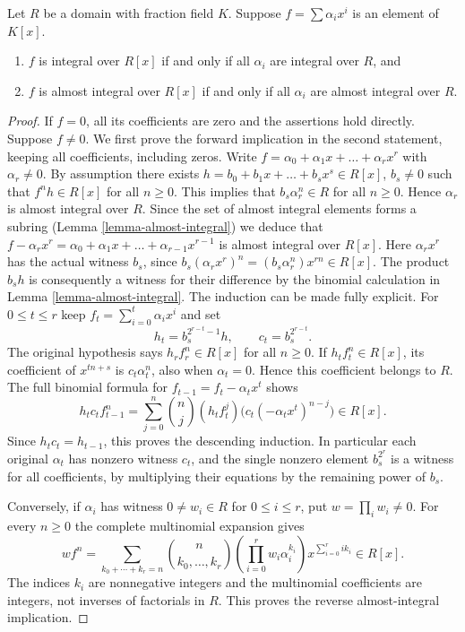 \begin{lemma}
\label{lemma-prepare-polynomial-ring-normal}
Let $R$ be a domain with fraction field $K$.
Suppose $f = \sum \alpha_i x^i$ is an
element of $K[x]$.
\begin{enumerate}
\item $f$ is integral over $R[x]$ if and only if
all $\alpha_i$ are integral over $R$, and
\item $f$ is almost integral over $R[x]$ if and only if
all $\alpha_i$ are almost integral over $R$.
\end{enumerate}
\end{lemma}

\begin{proof}
If $f=0$, all its coefficients are zero and the assertions hold
directly. Suppose $f\ne0$. We first prove the forward implication
in the second statement, keeping all coefficients, including zeros.
Write $f = \alpha_0 + \alpha_1 x + \ldots + \alpha_r x^r$
with $\alpha_r \not = 0$.
By assumption there exists $h = b_0 + b_1 x + \ldots + b_s x^s \in R[x]$,
$b_s \not = 0$ such that $f^n h \in R[x]$ for all
$n \geq 0$. This implies that $b_s \alpha_r^n \in R$
for all $n \geq 0$. Hence $\alpha_r$ is almost
integral over $R$. Since the set of almost integral
elements forms a subring (Lemma \ref{lemma-almost-integral}) we deduce that
$f - \alpha_r x^r = \alpha_0 + \alpha_1 x + \ldots + \alpha_{r - 1} x^{r - 1}$
is almost integral over $R[x]$. Here $\alpha_rx^r$ has the
actual witness $b_s$, since
$b_s(\alpha_rx^r)^n=(b_s\alpha_r^n)x^{rn}\in R[x]$.
The product $b_sh$ is consequently a witness for their difference
by the binomial calculation in Lemma \ref{lemma-almost-integral}.
The induction can be made fully explicit. For $0\leq t\leq r$
keep $f_t=\sum_{i=0}^t\alpha_ix^i$ and set
$$
h_t=b_s^{2^{r-t}-1}h,\qquad c_t=b_s^{2^{r-t}}.
$$
The original hypothesis says $h_rf_r^n\in R[x]$ for all $n\geq0$.
If $h_tf_t^n\in R[x]$, its coefficient of $x^{tn+s}$ is
$c_t\alpha_t^n$, also when $\alpha_t=0$. Hence this coefficient
belongs to $R$. The full binomial formula for
$f_{t-1}=f_t-\alpha_tx^t$ shows
$$
h_tc_t f_{t-1}^n
=\sum_{j=0}^n\binom nj(h_tf_t^j)
 \bigl(c_t(-\alpha_tx^t)^{n-j}\bigr)\in R[x].
$$
Since $h_tc_t=h_{t-1}$, this proves the descending induction.
In particular each original $\alpha_t$ has nonzero witness $c_t$,
and the single nonzero element $b_s^{2^r}$ is a witness for
all coefficients, by multiplying their equations by the remaining
power of $b_s$.

Conversely, if $\alpha_i$ has witness $0\ne w_i\in R$ for
$0\leq i\leq r$, put $w=\prod_iw_i\ne0$. For every $n\geq0$
the complete multinomial expansion gives
$$
w f^n=\sum_{k_0+\cdots+k_r=n}
\binom{n}{k_0,\ldots,k_r}
\left(\prod_{i=0}^r w_i\alpha_i^{k_i}\right)
x^{\sum_{i=0}^r i k_i}\in R[x].
$$
The indices $k_i$ are nonnegative integers and the multinomial
coefficients are integers, not inverses of factorials in $R$.
This proves the reverse almost-integral implication.


\end{proof}
